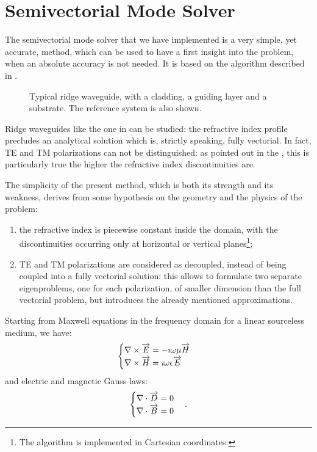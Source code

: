 \section{Semivectorial Mode Solver}  \label{sec:semivectorial_mode_solver}

The semivectorial mode solver that we have implemented is a very simple,
yet accurate, method, which can be used to have a first insight into
the problem, when an absolute accuracy is not needed. It is based on
the algorithm described in \cite{stern_semivectorial}.

\begin{figure}[htbp]
  \begin{center}
    \resizebox{6cm}{!}{}
  \end{center}
  \caption{Typical ridge waveguide, with a cladding, a guiding layer
    and a substrate. The reference system is also shown.}
  \label{fig:stern_fig1}
\end{figure}

Ridge waveguides like the one in  can be studied: the
refractive index profile precludes an analytical solution which is,
strictly speaking, fully vectorial. In fact, TE and TM polarizations
can not be distinguished: as pointed out in the
, this is particularly true the higher the
refractive index discontinuities are.

The simplicity of the present method, which is both its strength and
its weakness, derives from some hypothesis on the
geometry and the physics of the problem:
\begin{enumerate}
\item
  the refractive index is piecewise constant inside the domain, with the
  discontinuities occurring only at horizontal or vertical
  planes\footnote{The algorithm is implemented in Cartesian coordinates.};
\item
  TE and TM polarizations are considered as decoupled, instead of
  being coupled into a fully vectorial solution: this allows to
  formulate two separate eigenproblems, one for each polarization, of
  smaller dimension than the full vectorial problem, but introduces
  the already mentioned approximations.
\end{enumerate}

Starting from Maxwell equations in the frequency domain for a linear
sourceless medium, we have:
\begin{equation} \label{eqn:stern_maxwell} \begin{cases}
  {\nabla\times \overrightarrow{E}} = -\imath \omega \mu \overrightarrow{H} \\
  {\nabla \times \overrightarrow{H}} = \imath \omega \epsilon \overrightarrow{E} \\
\end{cases} \end{equation}
and electric and magnetic Gauss laws:
\begin{equation} \label{eqn:stern_gauss} \begin{cases}
  {\nabla\cdot \overrightarrow{D}} = 0 \\
  {\nabla \cdot \overrightarrow{B}} = 0
\end{cases} . \end{equation}

